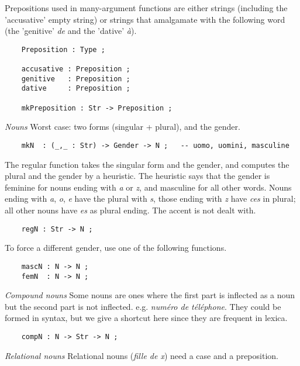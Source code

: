 \documentclass[11pt,a4paper]{article}
\newcommand{\subsubsubsection}[1]{\textit{#1}}
\begin{document}
Prepositions used in many-argument functions are either strings
(including the 'accusative' empty string) or strings that
amalgamate with the following word (the 'genitive' \textit{de} and the
'dative' \textit{à}).

\begin{verbatim}
    Preposition : Type ;
  
    accusative : Preposition ;
    genitive   : Preposition ;
    dative     : Preposition ;
  
    mkPreposition : Str -> Preposition ;
\end{verbatim}

\subsubsubsection{Nouns}
Worst case: two forms (singular + plural),
and the gender.

\begin{verbatim}
    mkN  : (_,_ : Str) -> Gender -> N ;   -- uomo, uomini, masculine
\end{verbatim}

The regular function takes the singular form and the gender,
and computes the plural and the gender by a heuristic. 
The heuristic says that the gender is feminine for nouns
ending with \textit{a} or \textit{z}, and masculine for all other words.
Nouns ending with \textit{a}, \textit{o}, \textit{e} have the plural with \textit{s},
those ending with \textit{z} have \textit{ces} in plural; all other nouns
have \textit{es} as plural ending. The accent is not dealt with.

\begin{verbatim}
    regN : Str -> N ;
\end{verbatim}

To force a different gender, use one of the following functions.

\begin{verbatim}
    mascN : N -> N ;
    femN  : N -> N ;
\end{verbatim}

\subsubsubsection{Compound nouns}
Some nouns are ones where the first part is inflected as a noun but
the second part is not inflected. e.g. \textit{numéro de téléphone}. 
They could be formed in syntax, but we give a shortcut here since
they are frequent in lexica.

\begin{verbatim}
    compN : N -> Str -> N ;
\end{verbatim}

\subsubsubsection{Relational nouns}
Relational nouns (\textit{fille de x}) need a case and a preposition. 
\end{document}
